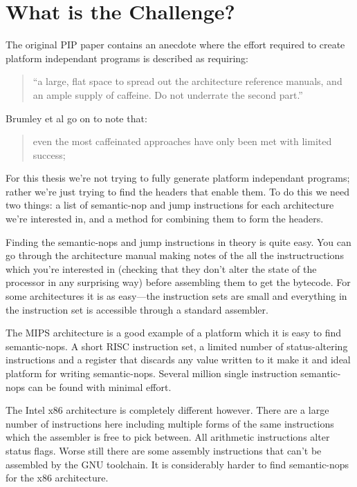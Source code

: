 \documentclass[]{book}
\begin{document}
\section{What is the Challenge?}

The original PIP paper\autocite{Cha:2010uh} contains an anecdote where
the effort required to create platform independant programs is described
as requiring:

\begin{quote}
``a large, flat space to spread out the architecture reference manuals,
and an ample supply of caffeine. Do not underrate the second part.''

\end{quote}
Brumley et al go on to note that:

\begin{quote}
even the most caffeinated approaches have only been met with limited
success;

\end{quote}
For this thesis we're not trying to fully generate platform independant
programs; rather we're just trying to find the headers that enable them.
To do this we need two things: a list of semantic-nop and jump
instructions for each architecture we're interested in, and a method for
combining them to form the headers.

Finding the semantic-nops and jump instructions in theory is quite easy.
You can go through the architecture manual making notes of the all the
instructructions which you're interested in (checking that they don't
alter the state of the processor in any surprising way) before
assembling them to get the bytecode. For some architectures it is as
easy---the instruction sets are small and everything in the instruction
set is accessible through a standard assembler.

The MIPS architecture\autocite{MIPSTechnologiesInc:2011ta} is a good
example of a platform which it is easy to find semantic-nops. A short
RISC instruction set, a limited number of status-altering instructions
and a register that discards any value written to it make it and ideal
platform for writing semantic-nops. Several million single instruction
semantic-nops can be found with minimal effort.

The Intel x86 architecture\autocite{IntelCorporation:1997ta} is
completely different however. There are a large number of instructions
here including multiple forms of the same instructions which the
assembler is free to pick between. All arithmetic instructions alter
status flags. Worse still there are some assembly instructions that
can't be assembled by the GNU toolchain\autocite{Anonymous:td}. It is
considerably harder to find semantic-nops for the x86 architecture.
\end{document}
